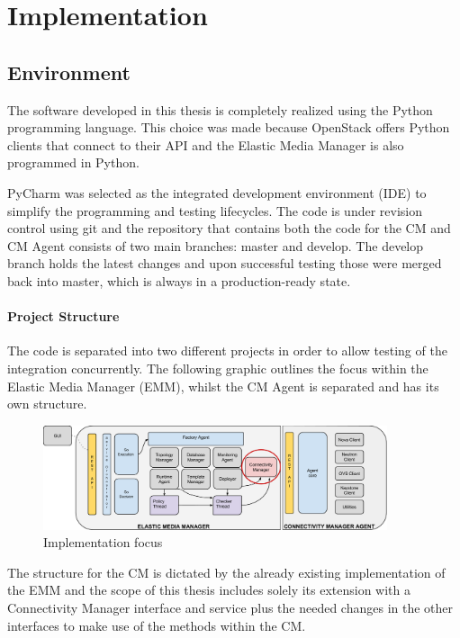 \chapter{Implementation}


\section{Environment}

The software developed in this thesis is completely realized using the Python programming language. This choice was made because OpenStack offers Python clients that connect to their API and the Elastic Media Manager is also programmed in Python.

PyCharm was selected as the integrated development environment (IDE) to simplify the programming and testing lifecycles. The code is under revision control using git and the repository that contains both the code for the CM and CM Agent consists of two main branches: master and develop. The develop branch holds the latest changes and upon successful testing those were merged back into master, which is always in a production-ready state.

\subsubsection{Project Structure}

The code is separated into two different projects in order to allow testing of the integration concurrently. The following graphic outlines the focus within the Elastic Media Manager (EMM), whilst the CM Agent is separated and has its own structure.

\begin{figure}[H]
\centering

\includegraphics[width=0.9\textwidth]{images/implementation/cm_implementation_focus_overview}

\caption{Implementation focus}
\end{figure}

The structure for the CM is dictated by the already existing implementation of the EMM and the scope of this thesis includes solely its extension with a Connectivity Manager interface and service plus the needed changes in the other interfaces to make use of the methods within the CM.


